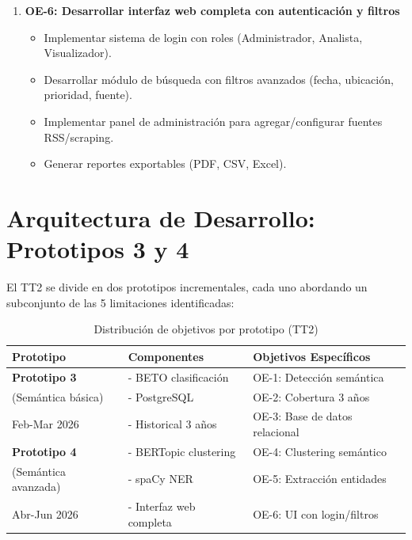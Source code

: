 \begin{enumerate}
    \item \textbf{OE-6: Desarrollar interfaz web completa con autenticación y filtros}
    \begin{itemize}
        \item Implementar sistema de login con roles (Administrador, Analista, Visualizador).
        \item Desarrollar módulo de búsqueda con filtros avanzados (fecha, ubicación, prioridad, fuente).
        \item Implementar panel de administración para agregar/configurar fuentes RSS/scraping.
        \item Generar reportes exportables (PDF, CSV, Excel).
    \end{itemize}
\end{enumerate}

\section{Arquitectura de Desarrollo: Prototipos 3 y 4}
\label{sec:lineas_trabajo_tt2}

El TT2 se divide en dos prototipos incrementales, cada uno abordando un subconjunto de las 5 limitaciones identificadas:

\begin{table}[h]
\centering
\caption{Distribución de objetivos por prototipo (TT2)}
\label{tab:prototipos_tt2}
\begin{tabular}{|l|p{5cm}|p{5cm}|}
\hline
\textbf{Prototipo} & \textbf{Componentes} & \textbf{Objetivos Específicos} \\ \hline
\textbf{Prototipo 3} & - BETO clasificación & OE-1: Detección semántica \\
(Semántica básica) & - PostgreSQL & OE-2: Cobertura 3 años \\
Feb-Mar 2026 & - Historical 3 años & OE-3: Base de datos relacional \\ \hline
\textbf{Prototipo 4} & - BERTopic clustering & OE-4: Clustering semántico \\
(Semántica avanzada) & - spaCy NER & OE-5: Extracción entidades \\
Abr-Jun 2026 & - Interfaz web completa & OE-6: UI con login/filtros \\ \hline
\end{tabular}
\end{table}

